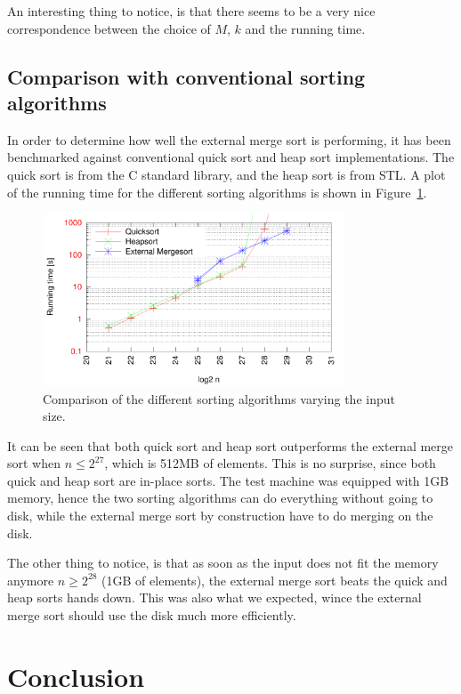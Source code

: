 \documentclass[a4paper,12pt]{article}
\begin{document}
An interesting thing to notice, is that there seems to be a very nice
correspondence between the choice of $M$, $k$ and the running
time.


\subsection{Comparison with conventional sorting algorithms}
In order to determine how well the external merge sort is performing,
it has been benchmarked against conventional quick sort and heap sort
implementations. The quick sort is from the C standard library, and
the heap sort is from STL. A plot of the running time for the
different sorting algorithms is shown in Figure~\ref{fig:best-sort}.

\begin{figure}[h!]
  \centering
  \includegraphics[width=0.8\textwidth]{best_sort}
  \caption{Comparison of the different sorting algorithms varying the input size.}
  \label{fig:best-sort}
\end{figure}

It can be seen that both quick sort and heap sort outperforms the
external merge sort when $n \leq 2^{27}$, which is 512MB of
elements. This is no surprise, since both quick and heap sort are
in-place sorts. The test machine was equipped with 1GB memory, hence
the two sorting algorithms can do everything without going to disk,
while the external merge sort by construction have to do merging on
the disk.

The other thing to notice, is that as soon as the input does not fit
the memory anymore $n \geq 2^{28}$ (1GB of elements), the external
merge sort beats the quick and heap sorts hands down. This was also
what we expected, wince the external merge sort should use the disk
much more efficiently.

\section{Conclusion}


\clearpage{}
\end{document}
